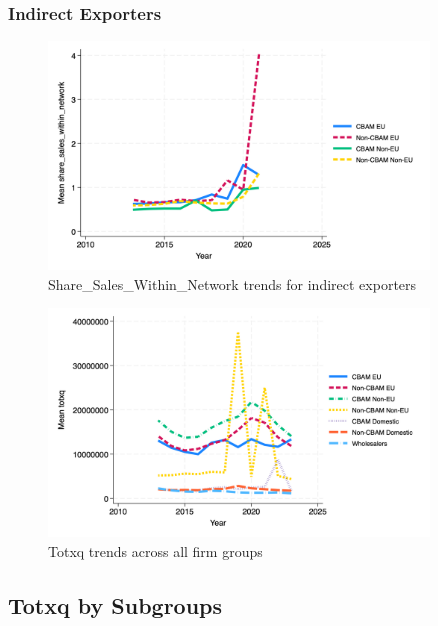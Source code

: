 \documentclass{article}
\begin{document}
\subsubsection{Indirect Exporters}
\begin{figure}[h!]
\centering
\includegraphics[width=0.9\textwidth]{share_sales_within_network_indir.png}
\caption{Share_Sales_Within_Network trends for indirect exporters}
\label{fig:share_sales_within_network_indir}
\end{figure}

\begin{figure}[h!]
\centering
\includegraphics[width=0.9\textwidth]{totxq_main_groups.png}
\caption{Totxq trends across all firm groups}
\label{fig:totxq_main}
\end{figure}

\subsection{Totxq by Subgroups}
\end{document}
